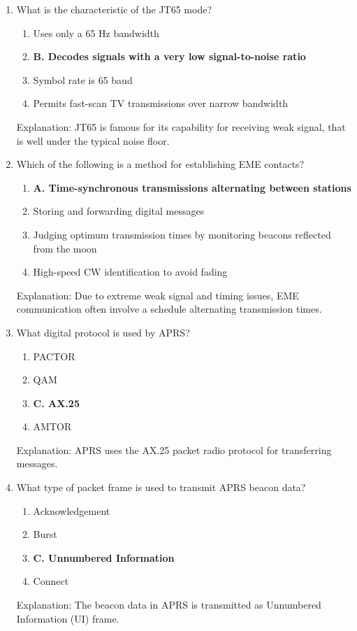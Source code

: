 \begin{enumerate}
       \item What is the characteristic of the JT65 mode?
      \begin{enumerate}
     \item  Uses only a 65 Hz bandwidth
        \item \textbf{B. Decodes signals with a very low signal-to-noise ratio}
       \item  Symbol rate is 65 baud
         \item  Permits fast-scan TV transmissions over narrow bandwidth
        \end{enumerate}
     \textcolor{myred}{Explanation:}
        JT65 is famous for its capability for receiving weak signal, that is well under the typical noise floor.

    \item Which of the following is a method for establishing EME contacts?
     \begin{enumerate}
       \item \textbf{A. Time-synchronous transmissions alternating between stations}
         \item  Storing and forwarding digital messages
        \item  Judging optimum transmission times by monitoring beacons reflected from the moon
        \item  High-speed CW identification to avoid fading
     \end{enumerate}
     \textcolor{myred}{Explanation:}
     Due to extreme weak signal and timing issues, EME communication often involve a schedule alternating transmission times.

     \item What digital protocol is used by APRS?
         \begin{enumerate}
       \item  PACTOR
        \item  QAM
      \item \textbf{C. AX.25}
       \item  AMTOR
       \end{enumerate}
    \textcolor{myred}{Explanation:}
     APRS uses the AX.25 packet radio protocol for transferring messages.
   
    \item What type of packet frame is used to transmit APRS beacon data?
    \begin{enumerate}
     \item  Acknowledgement
     \item  Burst
   \item \textbf{C. Unnumbered Information}
         \item  Connect
      \end{enumerate}
     \textcolor{myred}{Explanation:}
     The beacon data in APRS is transmitted as Unnumbered Information (UI) frame.
       

\end{enumerate}

